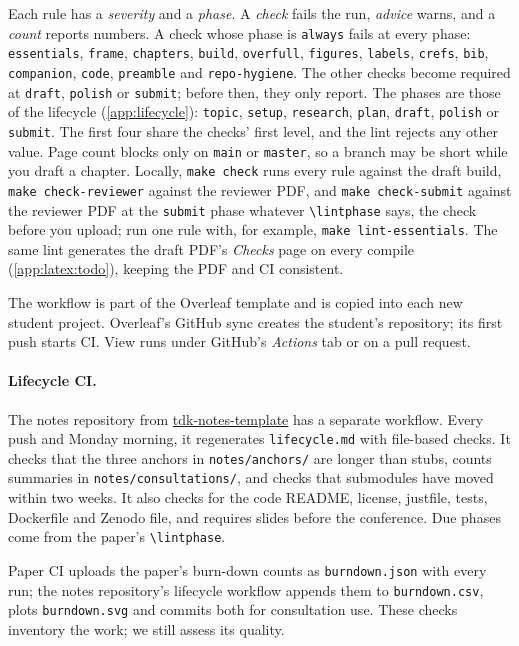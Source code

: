 Each rule has a \emph{severity} and a \emph{phase}. A \emph{check} fails the run, \emph{advice} warns, and a \emph{count} reports numbers. A check whose phase is \texttt{always} fails at every phase: \texttt{essentials}, \texttt{frame}, \texttt{chapters}, \texttt{build}, \texttt{overfull}, \texttt{figures}, \texttt{labels}, \texttt{crefs}, \texttt{bib}, \texttt{companion}, \texttt{code}, \texttt{preamble} and \texttt{repo-hygiene}. The other checks become required at \texttt{draft}, \texttt{polish} or \texttt{submit}; before then, they only report. The phases are those of the lifecycle (\cref{app:lifecycle}): \texttt{topic}, \texttt{setup}, \texttt{research}, \texttt{plan}, \texttt{draft}, \texttt{polish} or \texttt{submit}. The first four share the checks' first level, and the lint rejects any other value. Page count blocks only on \texttt{main} or \texttt{master}, so a branch may be short while you draft a chapter. Locally, \texttt{make check} runs every rule against the draft build, \texttt{make check-reviewer} against the reviewer PDF, and \texttt{make check-submit} against the reviewer PDF at the \texttt{submit} phase whatever \texttt{\textbackslash lintphase} says, the check before you upload; run one rule with, for example, \texttt{make lint-essentials}. The same lint generates the draft PDF's \emph{Checks} page on every compile (\cref{app:latex:todo}), keeping the PDF and CI consistent.

The workflow is part of the Overleaf template and is copied into each new student project. Overleaf's GitHub sync creates the student's repository; its first push starts CI. View runs under GitHub's \emph{Actions} tab or on a pull request.
\paragraph{Lifecycle CI.} The notes repository from \href{https://github.com/BlackLight54/tdk-notes-template}{tdk-notes-template} has a separate workflow. Every push and Monday morning, it regenerates \texttt{lifecycle.md} with file-based checks. It checks that the three anchors in \texttt{notes/anchors/} are longer than stubs, counts summaries in \texttt{notes/consultations/}, and checks that submodules have moved within two weeks. It also checks for the code README, license, justfile, tests, Dockerfile and Zenodo file, and requires slides before the conference. Due phases come from the paper's \texttt{\textbackslash lintphase}.

Paper CI uploads the paper's burn-down counts as \texttt{burndown.json} with every run; the notes repository's lifecycle workflow appends them to \texttt{burndown.csv}, plots \texttt{burndown.svg} and commits both for consultation use. These checks inventory the work; we still assess its quality.

